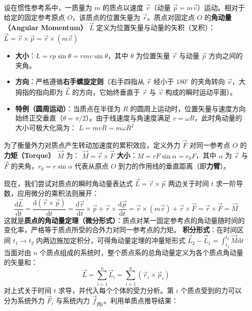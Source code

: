 \documentclass[lang=cn,11pt]{elegantbook}
\begin{document}
\begin{definition}[质点对定点的角动量和力矩]\label{def:angular-momentum}
设在惯性参考系中，一质量为 $m$ 的质点以速度 $\vec{v}$（动量 $\vec{p} = m\vec{v}$）运动。相对于给定的固定参考原点 $O$，该质点的位置矢量为 $\vec{r}$。质点对固定点 $O$ 的\textbf{角动量（Angular Momentum）} $\vec{L}$ 定义为位置矢量与动量的矢积（叉积）：
 \(\vec{L} = \vec{r} \times \vec{p} = \vec{r} \times (m\vec{v})\) 
\begin{itemize}
\item \textbf{大小}：$L = rp\sin\theta = rmv\sin\theta$，其中 $\theta$ 为位置矢量 $\vec{r}$ 与动量 $\vec{p}$ 方向之间的夹角。
\item \textbf{方向}：严格遵循\textbf{右手螺旋定则}（右手四指从 $\vec{r}$ 经小于 $180^\circ$ 的夹角转向 $\vec{v}$，大拇指的指向即为 $\vec{L}$ 的方向，它始终垂直于 $\vec{r}$ 与 $\vec{v}$ 构成的瞬时运动平面）。
\item \textbf{特例（圆周运动）}：当质点在半径为 $R$ 的圆周上运动时，位置矢量与速度方向始终正交垂直（$\theta = \pi/2$）。由于线速度与角速度满足 $v = \omega R$，此时角动量的大小可极大化简为：
 \(L = mvR = m\omega R^2\) 
\end{itemize}
为了衡量外力对质点产生转动加速度的累积效应，定义外力 $\vec{F}$ 对同一参考点 $O$ 的\textbf{力矩（Torque）} $\vec{M}$ 为：
 \(\vec{M} = \vec{r} \times \vec{F}\) 
\textbf{大小}：$M = rF\sin\alpha = r_0 F$，其中 $\alpha$ 为 $\vec{r}$ 与 $\vec{F}$ 的夹角，$r_0 = r\sin\alpha$ 代表从原点 $O$ 到力的作用线的垂直距离（即\textbf{力臂}）。
\end{definition}
现在，我们尝试对质点的瞬时角动量表达式 $\vec{L} = \vec{r} \times \vec{p}$ 两边关于时间 $t$ 求一阶导数，应用微分的乘积法则展开：
\[
\frac{\mathrm{d}\vec{L}}{\mathrm{d}t} = \frac{\mathrm{d}(\vec{r} \times \vec{p})}{\mathrm{d}t} = \frac{\mathrm{d}\vec{r}}{\mathrm{d}t} \times \vec{p} + \vec{r} \times \frac{\mathrm{d}\vec{p}}{\mathrm{d}t}= \vec{v} \times (m\vec{v})+ \vec{r} \times \vec{F} = \vec{r} \times \vec{F}=\vec{M}
\]
这就是\textbf{质点的角动量定理（微分形式）}：质点对某一固定参考点的角动量随时间的变化率，严格等于质点所受的合外力对同一参考点的力矩。
\textbf{积分形式}：在时间区间 $t_1 \to t_2$ 内两边施加定积分，可得角动量定理的冲量矩形式 \(\vec{L}_2 - \vec{L}_1 = \int_{t_1}^{t_2} \vec{M}\mathrm{d}t\) 
当面对由 $n$ 个质点组成的系统时，整个质点系的总角动量定义为各个质点角动量的矢量和：
\[
\vec{L} = \sum_{i=1}^{n} \vec{L}_i = \sum_{i=1}^{n} (\vec{r}_i \times \vec{p}_i)
\]
对上式关于时间 $t$ 求导，并代入每个个体的受力分析。第 $i$ 个质点受到的力可以分为系统外力 $\vec{F}_i$ 与系统内力 $\vec{f}_{\text{内}i}$。利用单质点推导结果：
\end{document}
